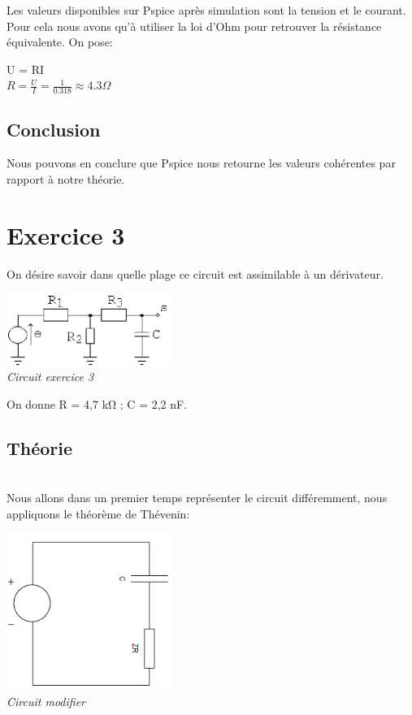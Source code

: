 \documentclass[a4paper,12pt,titlepage]{article}
\begin{document}
Les valeurs disponibles sur Pspice après simulation sont la tension et le courant. Pour cela nous avons qu'à utiliser la loi d'Ohm pour retrouver la résistance équivalente. On pose: 
\begin{center}
U = RI\\

$R = \frac{U}{I} = \frac{1}{0.318} \approx 4.3\Omega$
\end{center}

\subsection{Conclusion}

Nous pouvons en conclure que Pspice nous retourne les valeurs cohérentes par rapport à notre théorie.\\

\section{Exercice 3}

On désire savoir dans quelle plage ce circuit est assimilable à un dérivateur.\\

\begin{center}
    \includegraphics[width=0.4\textwidth]{Exo3/Exo3.PNG}\\
    \textit{Circuit exercice 3}\\
\end{center}
On donne R = 4,7 kΩ ; C = 2,2 nF.\\


\subsection{Théorie}\\

Nous allons dans un premier temps représenter le circuit différemment, nous appliquons le théorème de Thévenin: 
\begin{center}
    \includegraphics[width=0.4\textwidth]{Exo3/Exo3(bis).PNG}\\
    \textit{Circuit modifier}\\
\end{center}
\end{document}
